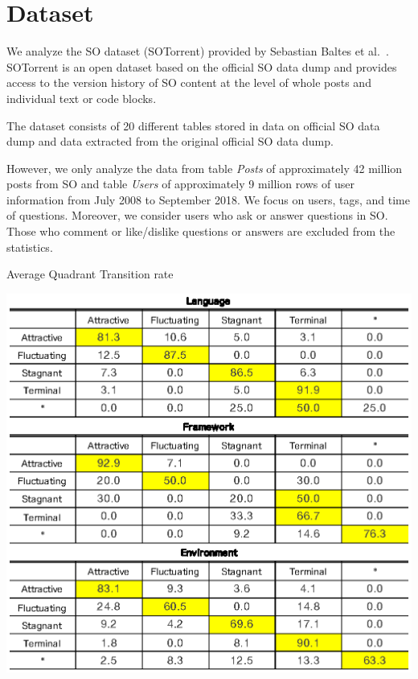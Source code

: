 \documentclass[conference]{IEEEtran}
\begin{document}
\section{Dataset}
We analyze the SO dataset (SOTorrent) provided by Sebastian Baltes et al.~\cite{msr2019challenge}. SOTorrent is an open dataset based on the official SO data dump and provides access to the version history of SO content at the level of whole posts and individual text or code blocks.

The dataset consists of 20 different tables stored in data on official SO data dump and data extracted from the original official SO data dump.

However, we only analyze the data from table \emph{Posts} of approximately 42 million posts from SO and table \emph{Users} of approximately 9 million rows of user information from July 2008 to September 2018. We focus on  users, tags, and time of questions. Moreover, we consider users who ask or answer questions in SO. Those who comment or like/dislike questions or answers are excluded from the statistics.

\begin{table}[t]
 \centering
 \caption{Average Quadrant Transition rate}
 \includegraphics[width=1.0\hsize]{img/transitionnew.eps} 
 \label{table2} 
\end{table}
\end{document}
